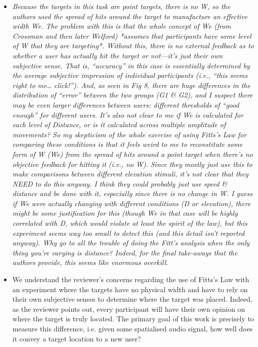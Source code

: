 \documentclass{article}
\begin{document}
\begin{itemize}
  \item \textit{Because the targets in this task are point targets, there is no W, so the authors used the spread of hits around the target to manufacture an effective width We. The problem with this is that the whole concept of We (from Crossman and then later Welford) *assumes that participants have some level of W that they are targeting*. Without this, there is no external feedback as to whether a user has actually hit the target or not—it’s just their own subjective sense. That is, “accuracy” in this case is essentially determined by the average subjective impression of individual participants (i.e., “this seems right to me… click!”). And, as seen in Fig 8, there are huge differences in the distribution of “error” between the two groups (G1 \& G2), and I suspect there may be even larger differences between users: different thresholds of “good enough” for different users. It’s also not clear to me if We is calculated for each level of Distance, or is it calculated across multiple amplitude of movements?
    So my skepticism of the whole exercise of using Fitts’s Law for comparing these conditions is that it feels weird to me to reconstitute some form of W (We) from the spread of hits around a point target when there’s no objective feedback for hitting it (i.e., no W). Since they mostly just use this to make comparisons between different elevation stimuli, it’s not clear that they NEED to do this anyway. I think they could probably just use speed \& distance and be done with it, especially since there is no change in W. I guess if We were actually changing with different conditions (D or elevation), there might be some justification for this (though We in that case will be highly correlated with D, which would violate at least the spirit of the law), but this experiment seems way too small to detect this (and this detail isn’t reported anyway). Why go to all the trouble of doing the Fitt’s analysis when the only thing you’re varying is distance? Indeed, for the final take-aways that the authors provide, this seems like enormous overkill.}
  \item[] We understand the reviewer's concerns regarding the use of Fitts's Law with an experiment where the targets have no physical width and have to rely on their own subjective senses to determine where the target was placed. 
    Indeed, as the reviewer points out, every participant will have their own opinion on where the target is truly located.
    The primary goal of this work is precisely to measure this difference, i.e. given some spatialised audio signal, how well does it convey a target location to a new user?

\end{itemize}
\end{document}
